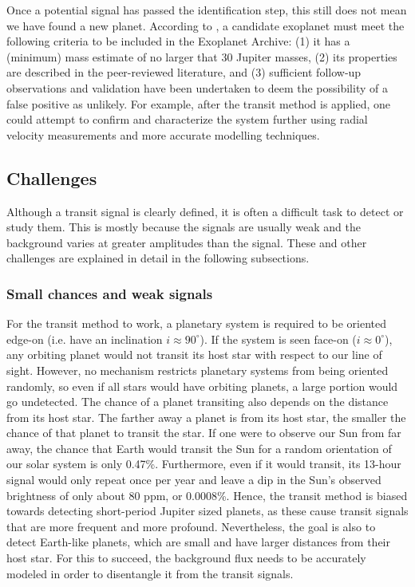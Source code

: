 Once a potential signal has passed the identification step, this still does not mean we have found a new planet. According to \cite{akeson2013nasa}, a candidate exoplanet must meet the following criteria to be included in the Exoplanet Archive: (1) it has a (minimum) mass estimate of no larger that 30 Jupiter masses, (2) its properties are described in the peer-reviewed literature, and (3) sufficient follow-up observations and validation have been undertaken to deem the possibility of a false positive as unlikely. For example, after the transit method is applied, one could attempt to confirm and characterize the system further using radial velocity measurements and more accurate modelling techniques.


\subsection{Challenges}
\label{sec:challenges}

Although a transit signal is clearly defined, it is often a difficult task to detect or study them. This is mostly because the signals are usually weak and the background varies at greater amplitudes than the signal. These and other challenges are explained in detail in the following subsections.

\subsubsection{Small chances and weak signals}

For the transit method to work, a planetary system is required to be oriented edge-on (i.e. have an inclination $i \approx 90^\circ$). If the system is seen face-on ($i \approx 0^\circ$), any orbiting planet would not transit its host star with respect to our line of sight. However, no mechanism restricts planetary systems from being oriented randomly, so even if all stars would have orbiting planets, a large portion would go undetected. The chance of a planet transiting also depends on the distance from its host star. The farther away a planet is from its host star, the smaller the chance of that planet to transit the star.  If one were to observe our Sun from far away, the chance that Earth would transit the Sun for a random orientation of our solar system is only 0.47\%. Furthermore, even if it would transit, its 13-hour signal would only repeat once per year and leave a dip in the Sun's observed brightness of only about 80 ppm, or 0.0008\%. Hence, the transit method is biased towards detecting short-period Jupiter sized planets, as these cause transit signals that are more frequent and more profound. Nevertheless, the goal is also to detect Earth-like planets, which are small and have larger distances from their host star. For this to succeed, the background flux needs to be accurately modeled in order to disentangle it from the transit signals.

